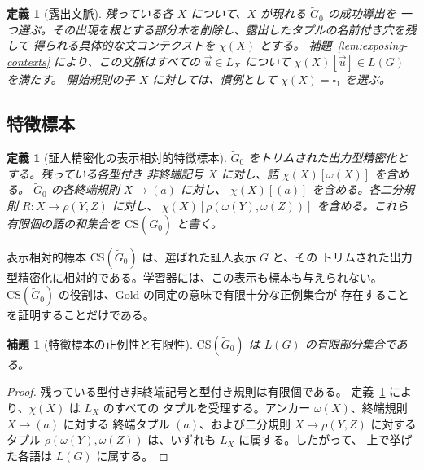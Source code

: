\documentclass[11pt,a4paper]{ltjsarticle}
\newtheorem{lemma}[theorem]{補題}
\newtheorem{definition}[theorem]{定義}
\theoremstyle{remark}
\newcommand{\CS}{\mathrm{CS}}
\newcommand{\tuple}[1]{\vec{#1}}
\newcommand{\blank}{\square}
\begin{document}
\begin{definition}[露出文脈]
\label{def:exposing-context}
残っている各 \(X\) について、\(X\) が現れる \(\widetilde G_0\) の成功導出を
一つ選ぶ。その出現を根とする部分木を削除し、露出したタプルの名前付き穴を残して
得られる具体的な文コンテクストを \(\chi(X)\) とする。
補題~\ref{lem:exposing-contexts} により、この文脈はすべての
\(\tuple u\in L_X\) について \(\chi(X)[\tuple u]\in L(G)\) を満たす。
開始規則の子 \(X\) に対しては、慣例として \(\chi(X)=\blank_1\) を選ぶ。
\end{definition}

\subsection{特徴標本}
\label{subsec:learner-grammar}

\begin{definition}[証人精密化の表示相対的特徴標本]
\label{def:cs}
\(\widetilde G_0\) をトリムされた出力型精密化とする。残っている各型付き
非終端記号 \(X\) に対し、語 \(\chi(X)[\omega(X)]\) を含める。
\(\widetilde G_0\) の各終端規則 \(X\to(a)\) に対し、
\(\chi(X)[(a)]\) を含める。各二分規則
\(R\colon X\to\rho(Y,Z)\) に対し、
\(\chi(X)[\rho(\omega(Y),\omega(Z))]\) を含める。これら有限個の語の和集合を
\(\CS(\widetilde G_0)\) と書く。
\end{definition}

表示相対的標本 \(\CS(\widetilde G_0)\) は、選ばれた証人表示 \(G\) と、その
トリムされた出力型精密化に相対的である。学習器には、この表示も標本も与えられない。
\(\CS(\widetilde G_0)\) の役割は、Gold の同定の意味で有限十分な正例集合が
存在することを証明することだけである。

\begin{lemma}[特徴標本の正例性と有限性]
\label{lem:cs-positive}
\(\CS(\widetilde G_0)\) は \(L(G)\) の有限部分集合である。
\end{lemma}

\begin{proof}
残っている型付き非終端記号と型付き規則は有限個である。
定義~\ref{def:exposing-context} により、\(\chi(X)\) は \(L_X\) のすべての
タプルを受理する。アンカー \(\omega(X)\)、終端規則 \(X\to(a)\) に対する
終端タプル \((a)\)、および二分規則 \(X\to\rho(Y,Z)\) に対するタプル
\(\rho(\omega(Y),\omega(Z))\) は、いずれも \(L_X\) に属する。したがって、
上で挙げた各語は \(L(G)\) に属する。
\end{proof}
\end{document}
